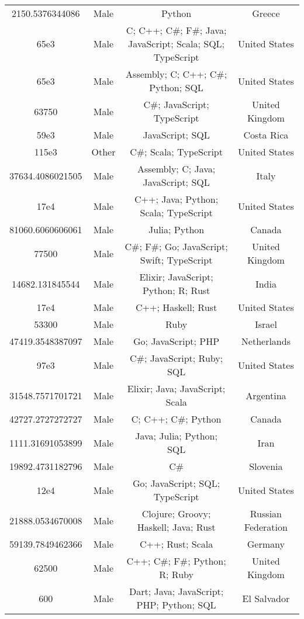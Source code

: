 \begin{center}
\begin{tabular}{ |c|c|c|c| }
2150.5376344086  &  Male  &  Python  &  Greece  \\ 
65e3  &  Male  &  C; C++; C\#; F\#; Java; JavaScript; Scala; SQL; TypeScript  &  United States  \\ 
65e3  &  Male  &  Assembly; C; C++; C\#; Python; SQL  &  United States  \\ 
63750  &  Male  &  C\#; JavaScript; TypeScript  &  United Kingdom  \\ 
59e3  &  Male  &  JavaScript; SQL  &  Costa Rica  \\ 
115e3  &  Other  &  C\#; Scala; TypeScript  &  United States  \\ 
37634.4086021505  &  Male  &  Assembly; C; Java; JavaScript; SQL  &  Italy  \\ 
17e4  &  Male  &  C++; Java; Python; Scala; TypeScript  &  United States  \\ 
81060.6060606061  &  Male  &  Julia; Python  &  Canada  \\ 
77500  &  Male  &  C\#; F\#; Go; JavaScript; Swift; TypeScript  &  United Kingdom  \\ 
14682.131845544  &  Male  &  Elixir; JavaScript; Python; R; Rust  &  India  \\ 
17e4  &  Male  &  C++; Haskell; Rust  &  United States  \\ 
53300  &  Male  &  Ruby  &  Israel  \\ 
47419.3548387097  &  Male  &  Go; JavaScript; PHP  &  Netherlands  \\ 
97e3  &  Male  &  C\#; JavaScript; Ruby; SQL  &  United States  \\ 
31548.7571701721  &  Male  &  Elixir; Java; JavaScript; Scala  &  Argentina  \\ 
42727.2727272727  &  Male  &  C; C++; C\#; Python  &  Canada  \\ 
1111.31691053899  &  Male  &  Java; Julia; Python; SQL  &  Iran  \\ 
19892.4731182796  &  Male  &  C\#  &  Slovenia  \\ 
12e4  &  Male  &  Go; JavaScript; SQL; TypeScript  &  United States  \\ 
21888.0534670008  &  Male  &  Clojure; Groovy; Haskell; Java; Rust  &  Russian Federation  \\ 
59139.7849462366  &  Male  &  C++; Rust; Scala  &  Germany  \\ 
62500  &  Male  &  C++; C\#; F\#; Python; R; Ruby  &  United Kingdom  \\ 
600  &  Male  &  Dart; Java; JavaScript; PHP; Python; SQL  &  El Salvador  \\ 

\end{tabular}
\end{center}

